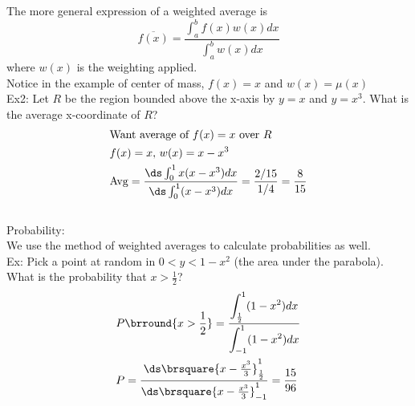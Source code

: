 The more general expression of a weighted average is
$$\overline{f(x)}=\frac{\displaystyle{\int_a^bf(x)w(x)dx}}{\displaystyle{\int_a^bw(x)dx}}$$
where $w(x)$ is the weighting applied.\\
Notice in the example of center of mass, $f(x)=x$ and $w(x)=\mu(x)$\\
Ex2: Let $R$ be the region bounded above the x-axis by $y=x$ and $y=x^3$. What is the average x-coordinate of $R$?
\begin{align*}
    &\text{Want average of $f(x)=x$ over $R$}\\
    &f(x)=x,\,w(x)=x-x^3\\
    &\mathrm{Avg}=\frac{\ds\int_0^1x(x-x^3)dx}{\ds\int_0^1(x-x^3)dx}=\frac{2/15}{1/4}=\frac{8}{15}
\end{align*}
\\
Probability:\\
We use the method of weighted averages to calculate probabilities as well.\\
Ex: Pick a point at random in $0<y<1-x^2$ (the area under the parabola). What is the probability that $x>\frac{1}{2}$?
\begin{align*}
    &P\brround{x>\frac{1}{2}}=\frac{\displaystyle{\int_{\frac{1}{2}}^1(1-x^2)dx}}{\displaystyle{\int_{-1}^1(1-x^2)dx}}\\
    &P=\frac{\ds\brsquare{x-\frac{x^3}{3}}_{\frac{1}{2}}^1}{\ds\brsquare{x-\frac{x^3}{3}}_{-1}^1}=\frac{15}{96}
\end{align*}